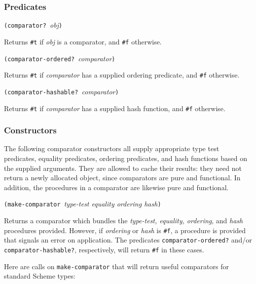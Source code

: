 \subsubsection{Predicates}\label{predicates}

\texttt{(comparator?\ }\emph{obj}\texttt{)}

Returns \texttt{\#t} if \emph{obj} is a comparator, and \texttt{\#f}
otherwise.

\texttt{(comparator-ordered?\ }\emph{comparator}\texttt{)}

Returns \texttt{\#t} if \emph{comparator} has a supplied ordering
predicate, and \texttt{\#f} otherwise.

\texttt{(comparator-hashable?\ }\emph{comparator}\texttt{)}

Returns \texttt{\#t} if \emph{comparator} has a supplied hash function,
and \texttt{\#f} otherwise.

\hypertarget{Constructors}{\subsubsection{Constructors}\label{Constructors}}

The following comparator constructors all supply appropriate type test
predicates, equality predicates, ordering predicates, and hash functions
based on the supplied arguments. They are allowed to cache their
results: they need not return a newly allocated object, since
comparators are pure and functional. In addition, the procedures in a
comparator are likewise pure and functional.

\texttt{(make-comparator\ }\emph{type-test equality ordering
hash}\texttt{)}

Returns a comparator which bundles the \emph{type-test, equality,
ordering}, and \emph{hash} procedures provided. However, if
\emph{ordering} or \emph{hash} is \texttt{\#f}, a procedure is provided
that signals an error on application. The predicates
\texttt{comparator-ordered?} and/or \texttt{comparator-hashable?},
respectively, will return \texttt{\#f} in these cases.

Here are calls on \texttt{make-comparator} that will return useful
comparators for standard Scheme types:

